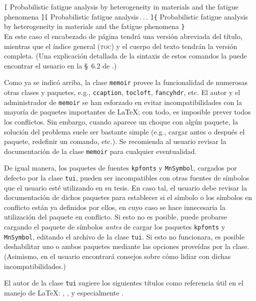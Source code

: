 \documentclass[11pt,
              article,
              oneside
              ]{memoir}
\newcommand*{\paquete}[1]{\texttt{\color{NavyBlue}#1}\xspace}
\newcommand*{\tui}{{\normalfont\paquete{tui}}\xspace}
\newcommand*{\MEMOIR}{\paquete{memoir}}
\begin{document}
\begin{compactenum}
{        \verb+[+%
        {Probabilistic fatigue analysis by heterogeneity in materials and the fatigue phenomena}%
        \verb+][+%
        {Probabilistic fatigue analysis\,.\,.\,.}%
        \verb+]{+%
        {Probabilistic fatigue analysis by heterogeneity in materials and the fatigue phenomena}%
        \verb+}+%
       }
       \ \\[6pt]
       \noindent En este caso el encabezado de página tendrá una versión abreviada del título, mientras que el índice general (\textsc{toc}) y el cuerpo del texto tendrán la versión completa. (Una explicación detallada de la sintaxis de estos comandos la puede encontrar el usuario en la \S\ 6.2 de \cite{MEMOIR}.)
	\item Como ya se indicó arriba, la clase \MEMOIR provee la funcionalidad de numerosas otras clases y paquetes, e.g., \paquete{ccaption}, \paquete{tocloft}, \paquete{fancyhdr}, etc. El autor y el administrador de \MEMOIR se han esforzado en evitar incompatibilidades con la mayoría de paquetes importantes de \LaTeX{}; con todo, es imposible prever todos los conflictos. Sin embargo, cuando aparece un choque con algún paquete, la solución del problema suele ser bastante simple (e.g., cargar antes o después el paquete, redefinir un comando, etc.). Se recomienda al usuario revisar la documentación de la clase \MEMOIR para cualquier eventualidad. 
	\item De igual manera, los paquetes de fuentes \paquete{kpfonts} y \paquete{MnSymbol}, cargados por defecto por la clase \tui, pueden ser incompatibles con otras fuentes de símbolos que el usuario esté utilizando en su tesis. En caso tal, el usuario debe revisar la documentación de dichos paquetes para establecer si el símbolo o los símbolos en conflicto están ya definidos por ellos, en cuyo caso se hace innecesaria la utilización del paquete en conflicto. Si esto no es posible, puede probarse cargando el paquete de símbolos \emph{antes} de cargar los paquetes \paquete{kpfonts} y \paquete{MnSymbol}, editando el archivo de la clase \tui. Si esto no funcionara, es posible deshabilitar uno o ambos paquetes mediante las opciones proveídas por la clase. (Asimismo, en \cite{SYMBOLS} el usuario encontrará consejos sobre cómo lidiar con dichas incompatibilidades.)
	\item El autor de la clase \tui sugiere los siguientes títulos como referencia útil en el manejo de \LaTeX: \cite{COMPANION}, \cite{GOOSSENS94}, \cite{KOPKA} y especialmente \cite{UNIVERSO}.
\end{compactenum}
\end{document}
